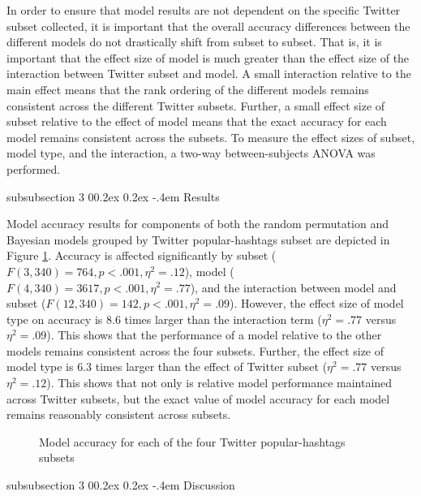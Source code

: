 \documentclass[man,floatsintext,donotrepeattitle]{apa6}
\makeatletter
\renewcommand{\subsubsection}{%
  \@startsection
  {subsubsection}%
  {3}%
  {\parindent}%
  {0\baselineskip \@plus 0.2ex \@minus 0.2ex}%
  {-.4em}%
  {\normalfont\normalsize\bfseries\addperi}}
\makeatother
\begin{document}
In order to ensure that model results are not dependent on the specific Twitter subset collected,
it is important that the overall accuracy differences between the different models do not drastically shift from subset to subset.
That is, it is important that the effect size of model is much greater than the effect size of the interaction between Twitter subset and model.
A small interaction relative to the main effect means that the rank ordering of the different models remains consistent across the different Twitter subsets.
Further, a small effect size of subset relative to the effect of model means that the exact accuracy for each model remains consistent across the subsets.
To measure the effect sizes of subset, model type, and the interaction, a two-way between-subjects ANOVA was performed.

\subsubsection{Results}

Model accuracy results for components of both the random permutation and Bayesian models grouped by Twitter popular-hashtags subset are depicted in Figure \ref{figContextSubsets}.
Accuracy is affected significantly by subset ($F(3, 340) = 764, p < .001, \eta ^ {2} = .12$), model ($F(4, 340) = 3617, p < .001, \eta ^ {2} = .77$),
and the interaction between model and subset ($F(12, 340) = 142, p < .001, \eta ^ {2} = .09$).
However, the effect size of model type on accuracy is \num{8.6} times larger than the interaction term ($\eta ^ {2} = .77$ versus $\eta ^ {2} = .09$).
This shows that the performance of a model relative to the other models remains consistent across the four subsets.
Further, the effect size of model type is \num{6.3} times larger than the effect of Twitter subset ($\eta ^ {2} = .77$ versus $\eta ^ {2} = .12$).
This shows that not only is relative model performance maintained across Twitter subsets, but the exact value of model accuracy for each model remains reasonably consistent across subsets.

\begin{figure}[!htbp]
  \caption{Model accuracy for each of the four Twitter popular-hashtags subsets}
  \label{figContextSubsets}
\end{figure}

\subsubsection{Discussion}
\end{document}
